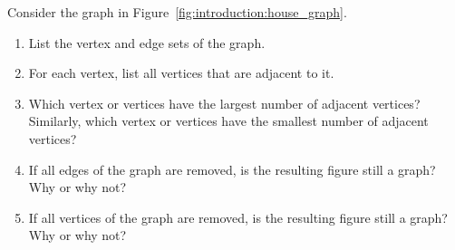 \begin{example}
\label{eg:introduction:house_graph}
Consider the graph in Figure~\ref{fig:introduction:house_graph}.
%
\begin{enumerate}
\item List the vertex and edge sets of the graph.

\item For each vertex, list all vertices that are adjacent to it.

\item Which vertex or vertices have the largest number of adjacent
  vertices? Similarly, which vertex or vertices have the smallest
  number of adjacent vertices?

\item If all edges of the graph are removed, is the resulting figure
  still a graph? Why or why not?

\item If all vertices of the graph are removed, is the resulting
  figure still a graph? Why or why not?
\end{enumerate}
\end{example}

